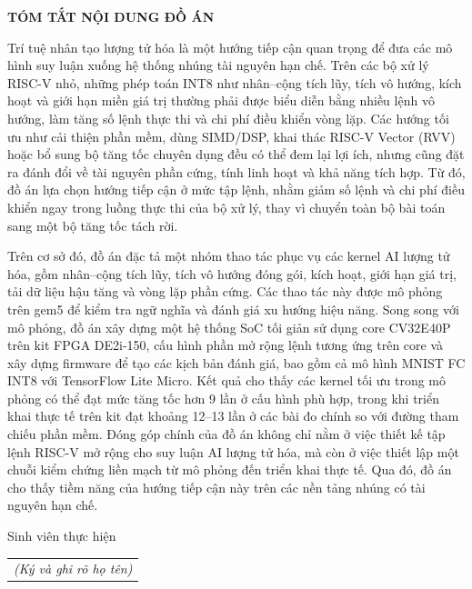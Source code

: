 \documentclass[../DoAn.tex]{subfiles}
\begin{document}
\begin{center}
    \Large{\textbf{TÓM TẮT NỘI DUNG ĐỒ ÁN}}\\
\end{center}
\vspace{1cm}

Trí tuệ nhân tạo lượng tử hóa là một hướng tiếp cận quan trọng để đưa các mô hình suy luận xuống hệ thống nhúng tài nguyên hạn chế. Trên các bộ xử lý RISC-V nhỏ, những phép toán INT8 như nhân--cộng tích lũy, tích vô hướng, kích hoạt và giới hạn miền giá trị thường phải được biểu diễn bằng nhiều lệnh vô hướng, làm tăng số lệnh thực thi và chi phí điều khiển vòng lặp. Các hướng tối ưu như cải thiện phần mềm, dùng SIMD/DSP, khai thác RISC-V Vector (RVV) hoặc bổ sung bộ tăng tốc chuyên dụng đều có thể đem lại lợi ích, nhưng cũng đặt ra đánh đổi về tài nguyên phần cứng, tính linh hoạt và khả năng tích hợp. Từ đó, đồ án lựa chọn hướng tiếp cận ở mức tập lệnh, nhằm giảm số lệnh và chi phí điều khiển ngay trong luồng thực thi của bộ xử lý, thay vì chuyển toàn bộ bài toán sang một bộ tăng tốc tách rời.

Trên cơ sở đó, đồ án đặc tả một nhóm thao tác phục vụ các kernel AI lượng tử hóa, gồm nhân--cộng tích lũy, tích vô hướng đóng gói, kích hoạt, giới hạn giá trị, tải dữ liệu hậu tăng và vòng lặp phần cứng. Các thao tác này được mô phỏng trên gem5 để kiểm tra ngữ nghĩa và đánh giá xu hướng hiệu năng. Song song với mô phỏng, đồ án xây dựng một hệ thống SoC tối giản sử dụng core CV32E40P trên kit FPGA DE2i-150, cấu hình phần mở rộng lệnh tương ứng trên core và xây dựng firmware để tạo các kịch bản đánh giá, bao gồm cả mô hình MNIST FC INT8 với TensorFlow Lite Micro. Kết quả cho thấy các kernel tối ưu trong mô phỏng có thể đạt mức tăng tốc hơn 9 lần ở cấu hình phù hợp, trong khi triển khai thực tế trên kit đạt khoảng 12--13 lần ở các bài đo chính so với đường tham chiếu phần mềm. Đóng góp chính của đồ án không chỉ nằm ở việc thiết kế tập lệnh RISC-V mở rộng cho suy luận AI lượng tử hóa, mà còn ở việc thiết lập một chuỗi kiểm chứng liền mạch từ mô phỏng đến triển khai thực tế. Qua đó, đồ án cho thấy tiềm năng của hướng tiếp cận này trên các nền tảng nhúng có tài nguyên hạn chế.

\begin{flushright}
Sinh viên thực hiện\\
\begin{tabular}{@{}c@{}}
\textit{(Ký và ghi rõ họ tên)}
\end{tabular}
\end{flushright}
\end{document}
